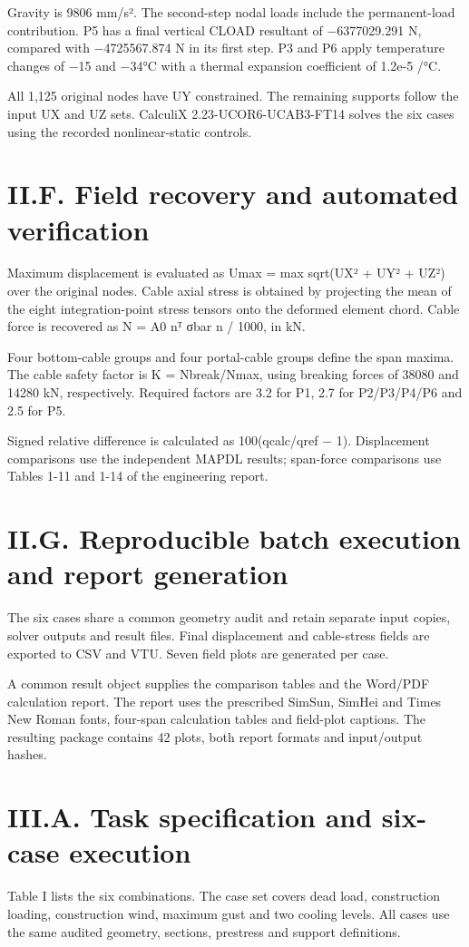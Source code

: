 \documentclass[11pt]{article}
\begin{document}
Gravity is 9806 mm/s². The second-step nodal loads include the permanent-load contribution. P5 has a final vertical CLOAD resultant of −6377029.291 N, compared with −4725567.874 N in its first step. P3 and P6 apply temperature changes of −15 and −34°C with a thermal expansion coefficient of 1.2e-5 /°C.

All 1,125 original nodes have UY constrained. The remaining supports follow the input UX and UZ sets. CalculiX 2.23-UCOR6-UCAB3-FT14 solves the six cases using the recorded nonlinear-static controls.

\section*{II.F. Field recovery and automated verification}
Maximum displacement is evaluated as Umax = max sqrt(UX² + UY² + UZ²) over the original nodes. Cable axial stress is obtained by projecting the mean of the eight integration-point stress tensors onto the deformed element chord. Cable force is recovered as N = A0 nᵀ σbar n / 1000, in kN.

Four bottom-cable groups and four portal-cable groups define the span maxima. The cable safety factor is K = Nbreak/Nmax, using breaking forces of 38080 and 14280 kN, respectively. Required factors are 3.2 for P1, 2.7 for P2/P3/P4/P6 and 2.5 for P5.

Signed relative difference is calculated as 100(qcalc/qref − 1). Displacement comparisons use the independent MAPDL results; span-force comparisons use Tables 1-11 and 1-14 of the engineering report.

\section*{II.G. Reproducible batch execution and report generation}
The six cases share a common geometry audit and retain separate input copies, solver outputs and result files. Final displacement and cable-stress fields are exported to CSV and VTU. Seven field plots are generated per case.

A common result object supplies the comparison tables and the Word/PDF calculation report. The report uses the prescribed SimSun, SimHei and Times New Roman fonts, four-span calculation tables and field-plot captions. The resulting package contains 42 plots, both report formats and input/output hashes.

\section*{III.A. Task specification and six-case execution}
Table I lists the six combinations. The case set covers dead load, construction loading, construction wind, maximum gust and two cooling levels. All cases use the same audited geometry, sections, prestress and support definitions.
\end{document}

